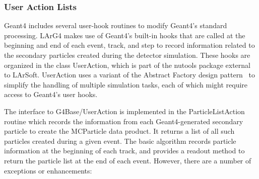 \documentclass[12pt]{elsarticle}
\newcommand{\larsoft}{LArSoft}
\begin{document}
\subsubsection{User Action Lists}
\label{sec:useractions}
Geant4 includes several user-hook routines to modify Geant4's
standard processing. LArG4 makes use of Geant4's built-in hooks that
are called at the beginning and end of each event, track, and step to
record information related to the secondary particles created during
the detector simulation. These hooks are organized in the class
UserAction, which is part of the nutools package external to
\larsoft. UserAction uses a variant of the Abstract Factory design
pattern~\cite{designpatterns} to simplify the handling of multiple
simulation tasks, each of which might require access to Geant4's user
hooks.

The interface to G4Base/UserAction is implemented in the ParticleListAction routine 
which records the
information from each Geant4-generated secondary particle to create
the MCParticle data product. It returns a list of all such particles
created during a given event.
The basic algorithm records particle
information at the beginning of each track, and provides a readout
method to return the particle list at the end of each event. However,
there are a number of exceptions or enhancements:
\end{document}
